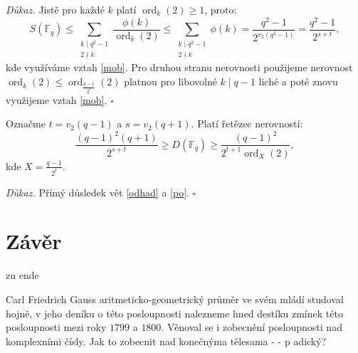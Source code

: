 \documentclass[12pt]{report}
\DeclareMathOperator{\ord}{ord}
\begin{document}
\noindent \textit{Důkaz.} Jistě pro každé $k$ platí $\ord_k (2) \geqslant 1$, proto:
$$S(\mathbb{F}_q) \leqslant \sum_{\substack{k \mid q^2-1 \\ 2 \nmid k}} \frac{\phi(k)}{\ord_k (2)} \leqslant \sum_{\substack{k \mid q^2-1 \\ 2 \nmid k}} \phi(k) = \frac{q^2-1}{2^{v_2(q^2-1)}} = \frac{q^2-1}{2^{s+t}},$$
kde využíváme vztah \eqref{mob}. Pro druhou stranu nerovnosti použijeme nerovnost $\ord_k(2) \leqslant \ord_{\frac{q-1}{2^{t}}}(2)$ platnou pro libovolné $k \mid q-1$ liché a poté znovu využijeme vztah \eqref{mob}. \hfill $\square$\\
 
\begin{dusledek}
Označme $t = v_2(q-1)$ a $s = v_2(q+1)$. Platí řetězec nerovností:
$$ \frac{(q-1)^2 (q+1)}{2^{s+t}} \geqslant D(\mathbb{F}_q) \geqslant  \frac{(q-1)^2}{2^{t+1} \ord_X ( 2 )},$$
kde $X = \frac{q-1}{2^t}$.
\end{dusledek}
\noindent \textit{Důkaz.} Přímý důsledek vět \ref{odhad} a \ref{po}. \hfill $\square$\\





\chapter*{Závěr}
zu ende

Carl Friedrich Gauss aritmeticko-geometrický průměr ve svém mládí studoval hojně, v jeho deníku o této posloupnosti nalezneme hned destíku zmínek této posloupnosti mezi roky $1799$ a $1800$. Věnoval se i zobecnění posloupnosti nad komplexními čísly. Jak to zobecnit nad konečnýma tělesama - - p adický?





\end{document}
